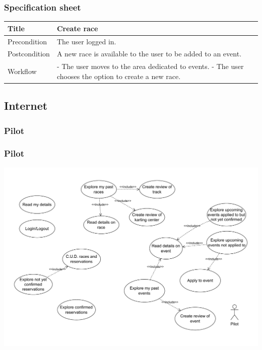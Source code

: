 \documentclass{beamer}
\begin{document}
\begin{frame}
    \frametitle{Specification sheet}
    \begin{table}
        \tiny
        \begin{tabular}{|p{2cm}|p{6cm}|}
        \hline
        Title & \textbf{Create race} \\
        \hline
        Precondition & The user logged in. \\
        \hline
        Postcondition & A new race is available to the user to be added to an event. \\
        \hline
        Workflow &
        - The user moves to the area dedicated to events. \newline
        - The user chooses the option to create a new race. \\
        \hline
        \end{tabular}
\end{table}
\end{frame}


\subsection*{Internet}

\subsubsection*{Pilot}

\begin{frame}
    \frametitle{Pilot}
    \centering
    \includegraphics[width=0.9\linewidth]{drawio/pilot.pdf}
\end{frame}

\end{document}
